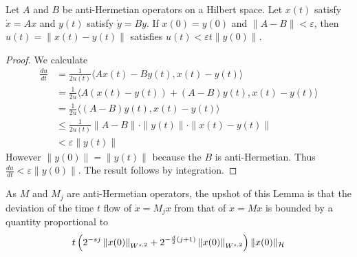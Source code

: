 \begin{lemma}
Let $A$ and $B$ be anti-Hermetian operators on a Hilbert space.  Let $x(t)$ satisfy $\dot{x} = Ax$ and $y(t)$ satisfy $\dot{y} = By$.  If $x(0) = y(0)$ and $\| A - B \| < \varepsilon$, then $u(t) = \| x(t) - y(t) \|$ satisfies $u(t) < \varepsilon t  \| y(0) \|$.
\end{lemma}

\begin{proof}
	We calculate
	\begin{align*}
		\frac{du}{dt} &= \frac{1}{2u(t)} \langle Ax(t) - By(t) , x(t) - y(t) \rangle \\
			&= \frac{1}{2u} \langle A(x(t)-y(t)) + (A-B) y(t) , x(t) - y(t) \rangle \\
			&= \frac{1}{2u} \langle (A-B)y(t) , x(t) - y(t) \rangle \\
			&\leq \frac{1}{2u(t)} \| A - B \| \cdot \| y(t) \| \cdot \| x(t) - y(t) \| \\
			&< \varepsilon \| y(t) \|
	\end{align*}
	However $\| y(0) \| = \| y(t)\|$ because the $B$ is anti-Hermetian.  Thus $\frac{du}{dt} < \varepsilon \| y(0)\|$.	The result follows by integration.
\end{proof}
As $M$ and $M_j$ are anti-Hermetian operators, the upshot of this Lemma is that the deviation of the time $t$ flow of $\dot{x} = M_j x$ from that of $\dot{x} = Mx$ is bounded by a quantity proportional to
\[
 	t \left( 2^{-sj}\left\| x(0) \right\|_{W^{s,2}} + 2^{-\frac{d}{2}(j+1)}\left\| x(0) \right\|_{W^{s,2}} \right) \| x (0) \|_{\mathcal{H}}
\]

